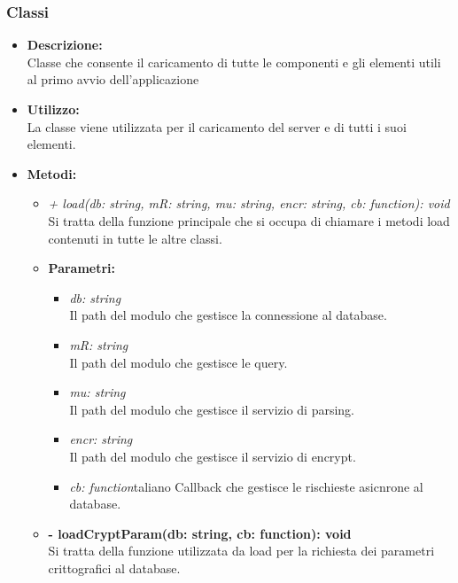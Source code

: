     \subsubsection{Classi}
        \begin{itemize}
          \item \textbf{Descrizione:}\\
          Classe che consente il caricamento di tutte le componenti e gli elementi utili al primo avvio dell'applicazione
          \item \textbf{Utilizzo:}\\
          La classe viene utilizzata per il caricamento del server e di tutti i suoi elementi.
          \item \textbf{Metodi:}\\
          \begin{itemize}
            \item \emph{+ load(db: string, mR: string, mu: string, encr: string, cb: function): void}\\
            Si tratta della funzione principale che si occupa di chiamare i metodi load contenuti in tutte le altre classi.
            \item \textbf{Parametri:}\\
            \begin{itemize}
              \item \emph{db: string}\\
              Il path del modulo che gestisce la connessione al database.
              \item \emph{mR: string}\\
              Il path del modulo che gestisce le query.
              \item \emph{mu: string}\\
              Il path del modulo che gestisce il servizio di parsing.
              \item \emph{encr: string}\\
              Il path del modulo che gestisce il servizio di encrypt.
              \item \emph{cb: function}taliano
              Callback che gestisce le rischieste asicnrone al database.
            \end{itemize}
            \item \textbf{- loadCryptParam(db: string, cb: function): void}\\
            Si tratta della funzione utilizzata da load per la richiesta dei parametri crittografici al database.

\end{itemize}
\end{itemize}
